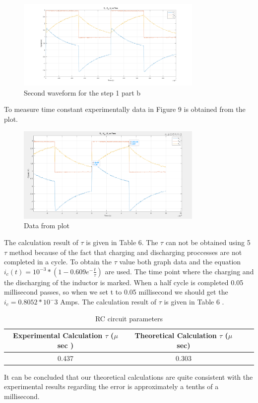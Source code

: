\documentclass[letterpaper,12pt]{article}
\begin{document}
\begin{figure}[H]
	\centering
   \includegraphics[width=0.8\textwidth]{1b_3.png}
   \caption{Second waveform for the step 1 part b}
\end{figure} 
To measure time constant experimentally data in Figure 9 is obtained from the plot.
\begin{figure}[H]
	\centering
   \includegraphics[width=0.8\textwidth]{1_b_3_plot_data.png}
   \caption{Data from plot}
\end{figure} 
The calculation result of \(\tau\) is given in Table 6. The \(\tau\) can not be obtained using 5 \(\tau\) method because of the fact that charging and discharging proccesses are not completed in a cycle. To obtain the \(\tau\) value both graph data and the equation \( i_c (t) = 10^{-3} * (1 - 0.609 e^-\frac{t}{\tau}) \)  are used. The time point where the charging and the discharging of the inductor is marked. When a half cycle is completed 0.05 millisecond passes, so when we set t to 0.05 millisecond we should get the \( i_c  = 0.8052*10^-3\) Amps. The calculation result of \( \tau \) is given in Table 6 .
%
\begin{table}[H]
	\begin{center}
	\caption{RC circuit parameters}
	\vspace{2mm}
		\begin{tabular}{||c | c | c | c||} 
		 \hline
		 Experimental Calculation \(\tau\) (\(\mu\) sec )& Theoretical Calculation \(\tau\) (\(\mu\) sec) \\ [0.5ex] 
		 \hline\hline
		 0.437 & 0.303 \\ 
		 \hline
	\end{tabular}
	\end{center}
	\end{table}
It can be concluded that our theoretical calculations are quite consistent with the experimental results regarding the error is approximately a tenths of a millisecond.
\end{document}
